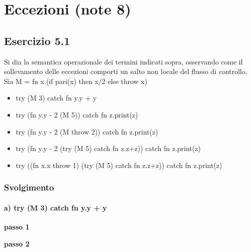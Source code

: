 \section{Eccezioni (note 8)}
\subsection*{Esercizio 5.1}
Si dia la semantica operazionale dei termini indicati sopra, osservando come il sollevamento delle eccezioni comporti un salto non locale del flusso di controllo.
Sia M = fn x.(if pari(x) then x/2 else throw x)
\begin{itemize}
	\item try (M 3) catch fn y.y + y
	\item try (fn y.y - 2 (M 5)) catch fn z.print(z)
	\item try (fn y.y - 2 (M throw 2)) catch fn z.print(z)
	\item try (fn y.y - 2 (try (M 5) catch fn z.z+z)) catch fn z.print(z)
	\item try ((fn x.x throw 1) (try (M 5) catch fn z.z+z)) catch fn z.print(z)
\end{itemize}  

\subsubsection*{Svolgimento} 

\paragraph{a) try (M 3) catch fn y.y + y}\mbox{}

\textbf{passo 1} 
\begin{prooftree} 
\end{prooftree}
  
\textbf{passo 2} \\		

